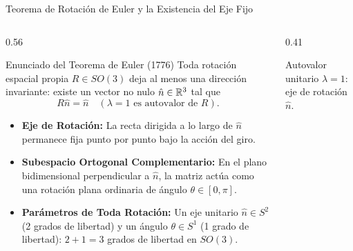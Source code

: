 \documentclass[10pt,aspectratio=169]{beamer}
\begin{document}
\begin{frame}{Teorema de Rotación de Euler y la Existencia del Eje Fijo}
  \begin{columns}[c]
    \begin{column}{0.56\textwidth}
      \footnotesize
      \begin{block}{Enunciado del Teorema de Euler (1776)}
        Toda rotación espacial propia $R \in SO(3)$ deja al menos una dirección invariante: existe un vector no nulo $\hat{n} \in \mathbb{R}^3$ tal que
        \[
        R\hat{n} = \hat{n} \quad (\lambda = 1 \text{ es autovalor de } R).
        \]
      \end{block}
      \begin{itemize}\itemsep2pt
        \item \textbf{Eje de Rotación:}
        La recta dirigida a lo largo de $\hat{n}$ permanece fija punto por punto bajo la acción del giro.
        \item \textbf{Subespacio Ortogonal Complementario:}
        En el plano bidimensional perpendicular a $\hat{n}$, la matriz actúa como una rotación plana ordinaria de ángulo $\theta \in [0, \pi]$.
        \item \textbf{Parámetros de Toda Rotación:}
        Un eje unitario $\hat{n} \in S^2$ (2 grados de libertad) y un ángulo $\theta \in S^1$ (1 grado de libertad): $2 + 1 = 3$ grados de libertad en $SO(3)$.
      \end{itemize}
    \end{column}
    \begin{column}{0.41\textwidth}
      \centering
      \vspace{0.1cm}
      {\scriptsize Autovalor unitario $\lambda = 1$: eje de rotación $\hat{n}$.}
    \end{column}
  \end{columns}
\end{frame}
\end{document}

